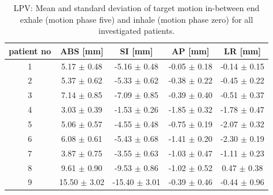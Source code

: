 \documentclass[type=dr, dr=rernat, accentcolor=tud7b,colorbacktitle, bigchapter, openright, twoside, 12pt ]{tudthesis}
\begin{document}
\begin{table}[htbp]
  \centering
  \caption{LPV: Mean and standard deviation of target motion in-between end exhale (motion phase five) and inhale (motion phase zero) for 
  all investigated patients.}
  \begin{tabular}{|c|c|c|c|c|}
    \hline\hline
    patient no\rule{0pt}{2.6ex}\rule[-1.2ex]{0pt}{0pt} & ABS [mm] & SI [mm] & AP [mm] & LR [mm]\\
    \hline
    1 & 5.17 $\pm$ 0.48 & -5.16 $\pm$ 0.48 & -0.05 $\pm$ 0.18 & -0.14 $\pm$ 0.15 \\
    2 & 5.37 $\pm$ 0.62 & -5.33 $\pm$ 0.62 & -0.38 $\pm$ 0.22 & -0.45 $\pm$ 0.22 \\
    3 & 7.14 $\pm$ 0.85 & -7.09 $\pm$ 0.85 & -0.39 $\pm$ 0.40 & -0.51 $\pm$ 0.37 \\
    4 & 3.03 $\pm$ 0.39 & -1.53 $\pm$ 0.26 & -1.85 $\pm$ 0.32 & -1.78 $\pm$ 0.47 \\
    5 & 5.06 $\pm$ 0.57 & -4.55 $\pm$ 0.48 & -0.75 $\pm$ 0.19 & -2.07 $\pm$ 0.32 \\
    6 & 6.08 $\pm$ 0.61 & -5.43 $\pm$ 0.68 & -1.41 $\pm$ 0.20 & -2.30 $\pm$ 0.19 \\
    7 & 3.87 $\pm$ 0.75 & -3.55 $\pm$ 0.63 & -1.03 $\pm$ 0.47 & -1.11 $\pm$ 0.23 \\
    8 & 9.61 $\pm$ 0.90 & -9.53 $\pm$ 0.86 & -1.02 $\pm$ 0.52 & 0.47 $\pm$ 0.38 \\
    9 & 15.50 $\pm$ 3.02 & -15.40 $\pm$ 3.01 & -0.39 $\pm$ 0.46 & -0.44 $\pm$ 0.96 \\
    \hline\hline
  \end{tabular}
  \label{tab:motion:LPV}
\end{table}

\vspace*{-0.5cm}
\end{document}
